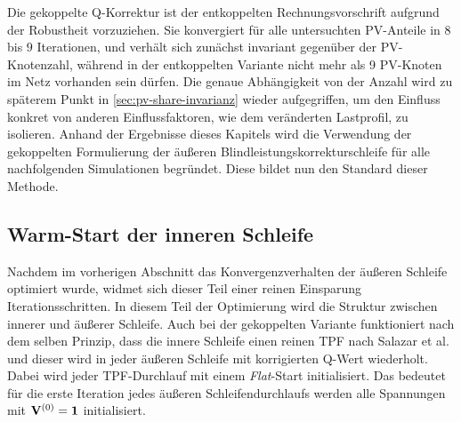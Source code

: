 Die gekoppelte Q-Korrektur ist der entkoppelten Rechnungsvorschrift aufgrund der Robustheit vorzuziehen.
Sie konvergiert für alle untersuchten PV-Anteile in $8$ bis $9$ Iterationen, und verhält sich zunächst invariant gegenüber der PV-Knotenzahl, während in der entkoppelten Variante nicht mehr als 9 PV-Knoten im Netz vorhanden sein dürfen.
Die genaue Abhängigkeit von der Anzahl wird zu späterem Punkt in \cref{sec:pv-share-invarianz} wieder aufgegriffen, um den Einfluss konkret von anderen Einflussfaktoren, wie dem veränderten Lastprofil, zu isolieren. 
Anhand der Ergebnisse dieses Kapitels wird die Verwendung der gekoppelten Formulierung der äußeren Blindleistungskorrekturschleife für alle nachfolgenden Simulationen begründet.
Diese bildet nun den Standard dieser Methode.




\subsection{Warm-Start der inneren Schleife}
\label{subsec:ergebnisse_warmstart}


	
Nachdem im vorherigen Abschnitt das Konvergenzverhalten der äußeren Schleife optimiert wurde, widmet sich dieser Teil einer reinen Einsparung Iterationsschritten.
In diesem Teil der Optimierung wird die Struktur zwischen innerer und äußerer Schleife.
Auch bei der gekoppelten Variante funktioniert nach dem selben Prinzip, dass die innere Schleife einen reinen TPF nach Salazar et al. \cite{Salazar2024} und dieser wird in jeder äußeren Schleife mit korrigierten Q-Wert wiederholt.
Dabei wird jeder TPF-Durchlauf mit einem \emph{Flat}-Start initialisiert. 
Das bedeutet für die erste Iteration jedes äußeren Schleifendurchlaufs werden alle Spannungen mit $\mathbf{V}^{(0)} = \boldsymbol{1}$ initialisiert.\\


